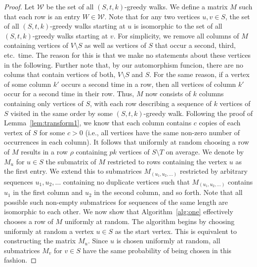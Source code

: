 \documentclass[10pt,a4paper]{article}
\begin{document}
{\begin{proof} 
    Let $\mathcal{W}$ be the set of all $(S, t, k)$-greedy walks. We define a
    matrix $M$ such that each row is an entry $W \in \mathcal{W}$. Note that for
    any two vertices $u, v \in S$, the set of all $(S, t, k)$-greedy walks
    starting at $u$ is isomorphic to the set of all $(S, t, k)$-greedy walks
    starting at $v$.
%
    {For simplicity, we remove all columns of $M$ containing vertices of
     $V \setminus S$ as well as vertices of $S$ that occur a second, third, etc.\ time. 
     The reason for this is that we make no statements about these vertices in the
following.
     {Further note} that, by our automorphism funcion, there are no colums that
contain vertices of both, $V \setminus S$ and $S$. For the same reason, if a vertex
of some column $k'$ occurs a second time in a row, then all vertices of
column $k'$ occur for a second time in their row.}
%
% 
%
    {Thus,}
    $M$ now {consists of} $k$ columns containing only vertices of $S$, with each row
    describing a sequence of $k$ vertices of $S$ visited {in the
    same order} by some $(S, t, k)$-greedy
    walk. Following the proof of Lemma~\ref{lem:transform1}, we know that each
    column contains $c$ copies of each vertex of $S$ for some $c > 0$ (i.e., all
    vertices have the same non-zero number of occurrences in each column). It
    follows that uniformly at random choosing a row of $M$ results in
    {a row} $\rho$ containing $p k$ vertices of $S \setminus T$ on average. We denote by
    $M_{u}$ for $u \in S$ the submatrix of $M$ restricted to rows containing the vertex $u$
    as the first entry. We extend this to submatrices $M_{(u_1, u_2, \ldots)}$
    restricted by arbitrary sequences $u_1, u_2, \ldots$ containing no duplicate
    vertices such that $M_{(u_1, u_2, \ldots)}$ contains $u_1$ in the first column
    and $u_2$ in the second column, and so forth.
%
    Note that all possible such non-empty submatrices for sequences of the same
    length are isomorphic to each other. We now show that Algorithm~\ref{alg:one}
    effectively chooses a row of $M$ uniformly at random. The algorithm begins by
    choosing uniformly at random a vertex $u \in S$ as the start vertex. This is
    equivalent to constructing the matrix $M_u$. Since $u$ is chosen uniformly at
    random, all submatrices $M_{v}$ for $v \in S$ have the same probability of being chosen
    in this fashion.
    

\end{proof}}
\end{document}
